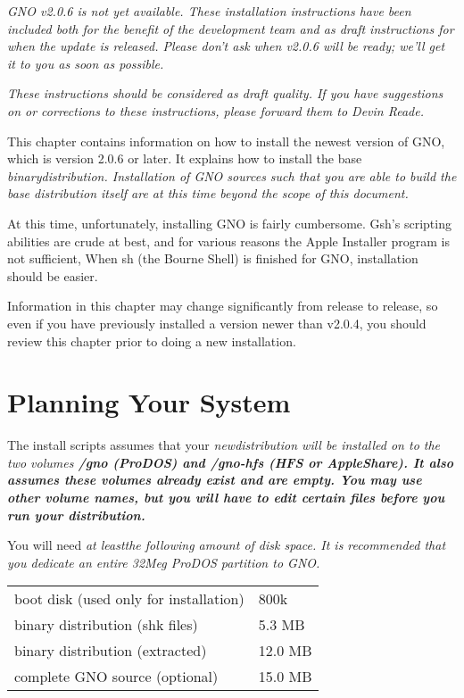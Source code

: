 \documentclass{report}
\begin{document}
\em GNO v2.0.6 is not yet available.  These installation instructions
have been included both for the benefit of the development team and as
draft instructions for when the update is released.  Please don't ask
when v2.0.6 will be ready; we'll get it to you as soon as possible.\rm

\em These instructions should be considered as draft quality.  If you
have suggestions on or corrections to these instructions, please forward
them to Devin Reade.\rm

This chapter contains information on how to install the newest version
of GNO, which is version 2.0.6 or later.  It explains how to install
the base \em binary\rm  distribution.  Installation of GNO sources such that
you are able to \em build \rm  the base distribution itself are at this
time beyond the scope of this document.

At this time, unfortunately, installing GNO is fairly cumbersome.
Gsh's scripting abilities are crude at best, and for various reasons
the Apple Installer program is not sufficient,
When sh (the Bourne Shell) is finished for GNO, installation should be easier.

Information in this chapter may change
significantly from release to release, so even if you have previously
installed a version newer than v2.0.4, you should review this chapter
prior to doing a new installation.

\section{Planning Your System}

The install scripts assumes that your \em new\rm  distribution will be 
installed on to the two volumes \bf /gno \rm  (ProDOS) and \bf /gno-hfs \rm 
(HFS or AppleShare).
It also assumes these volumes already exist and are \em empty\rm.
You may use other volume names,
but you will have to edit certain files before you run your distribution.

You will need \it at least\rm  the following amount of disk space.  
It is recommended that you dedicate an entire 32Meg ProDOS partition to
GNO.

\begin{tabular}{ll}
boot disk (used only for installation)	& 800k \\
binary distribution (shk files)		& 5.3 MB \\
binary distribution (extracted)		& 12.0 MB \\
complete GNO source (optional)		& 15.0 MB \\
\end{tabular}
\end{document}
